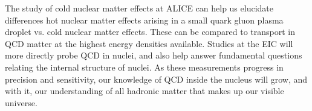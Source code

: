 The study of cold nuclear matter effects at ALICE can help us elucidate differences hot nuclear matter effects arising in a small quark gluon plasma droplet vs. cold nuclear matter effects. These can be compared to transport in QCD matter at the highest energy densities available. Studies at the EIC will more directly probe QCD in nuclei, and also help answer fundamental questions relating the internal structure of nuclei. As these measurements progress in precision and sensitivity, our knowledge of QCD inside the nucleus will grow, and with it, our understanding of all hadronic matter that makes up our visible universe.

